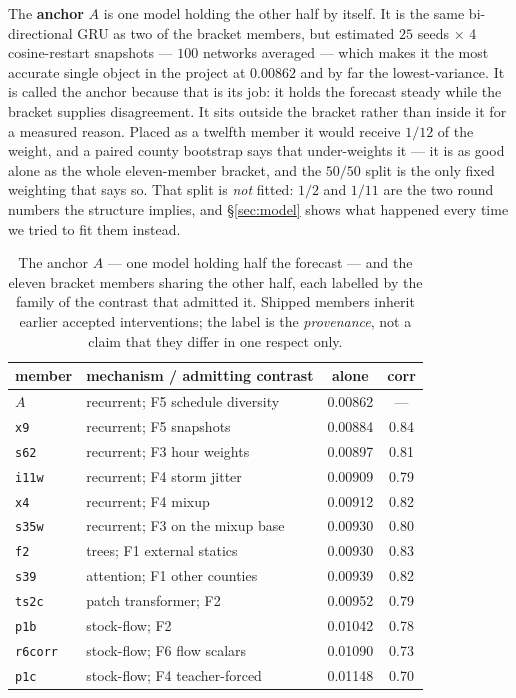 \documentclass[10pt,letterpaper,twocolumn]{article}
\begin{document}
The \textbf{anchor} $A$ is one model holding the other half by itself. It is the
same bi-directional GRU as two of the bracket members, but estimated $25$ seeds
$\times$ 4 cosine-restart snapshots --- $100$ networks averaged --- which makes
it the most accurate single object in the project at $0.00862$ and by far the
lowest-variance. It is called the anchor because that is its job: it holds the
forecast steady while the bracket supplies disagreement. It sits outside the
bracket rather than inside it for a measured reason. Placed as a twelfth member
it would receive $1/12$ of the weight, and a paired county bootstrap says that
under-weights it --- it is as good alone as the whole eleven-member bracket, and
the $50/50$ split is the only fixed weighting that says so. That split is
\emph{not} fitted: $1/2$ and $1/11$ are the two round numbers the structure
implies, and §\ref{sec:model} shows what happened every time we tried to fit
them instead.

\begin{table}[ht]\small\centering
\begin{tabular}{@{}llcc@{}}
\toprule
member & mechanism / admitting contrast & alone & corr \\
\midrule
$A$ & recurrent; F5 schedule diversity & 0.00862 & --- \\
\midrule
\texttt{x9} & recurrent; F5 snapshots & 0.00884 & 0.84 \\
\texttt{s62} & recurrent; F3 hour weights & 0.00897 & 0.81 \\
\texttt{i11w} & recurrent; F4 storm jitter & 0.00909 & 0.79 \\
\texttt{x4} & recurrent; F4 mixup & 0.00912 & 0.82 \\
\texttt{s35w} & recurrent; F3 on the mixup base & 0.00930 & 0.80 \\
\texttt{f2} & trees; F1 external statics & 0.00930 & 0.83 \\
\texttt{s39} & attention; F1 other counties & 0.00939 & 0.82 \\
\texttt{ts2c} & patch transformer; F2 & 0.00952 & 0.79 \\
\texttt{p1b} & stock-flow; F2 & 0.01042 & 0.78 \\
\texttt{r6corr} & stock-flow; F6 flow scalars & 0.01090 & 0.73 \\
\texttt{p1c} & stock-flow; F4 teacher-forced & 0.01148 & 0.70 \\
\bottomrule
\end{tabular}
\caption{The anchor $A$ --- one model holding half the forecast --- and the
eleven bracket members sharing the other half, each labelled by the family of
the contrast that admitted it.
Shipped members inherit earlier accepted interventions; the label is the
\emph{provenance}, not a claim that they differ in one respect only.}
\label{tab:mem}
\end{table}
\end{document}
